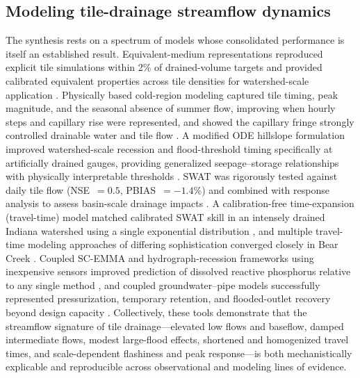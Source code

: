 \subsection{Modeling tile-drainage streamflow dynamics}

The synthesis rests on a spectrum of models whose consolidated performance is itself an established result. Equivalent-medium representations reproduced explicit tile simulations within 2\% of drained-volume targets and provided calibrated equivalent properties across tile densities for watershed-scale application \parencite{Thomas2016}. Physically based cold-region modeling captured tile timing, peak magnitude, and the seasonal absence of summer flow, improving when hourly steps and capillary rise were represented, and showed the capillary fringe strongly controlled drainable water and tile flow \parencite{Kompanizare2024}. A modified ODE hillslope formulation improved watershed-scale recession and flood-threshold timing specifically at artificially drained gauges, providing generalized seepage--storage relationships with physically interpretable thresholds \parencite{Fonley2021}. SWAT was rigorously tested against daily tile flow (NSE~$=0.5$, PBIAS~$=-1.4$\%) and combined with response analysis to assess basin-scale drainage impacts \parencite{Rahman2014}. A calibration-free time-expansion (travel-time) model matched calibrated SWAT skill in an intensely drained Indiana watershed using a single exponential distribution \parencite{Basu2010}, and multiple travel-time modeling approaches of differing sophistication converged closely in Bear Creek \parencite{Schilling2015}. Coupled SC-EMMA and hydrograph-recession frameworks using inexpensive sensors improved prediction of dissolved reactive phosphorus relative to any single method \parencite{Nazari2021}, and coupled groundwater--pipe models successfully represented pressurization, temporary retention, and flooded-outlet recovery beyond design capacity \parencite{Henine2014}. Collectively, these tools demonstrate that the streamflow signature of tile drainage---elevated low flows and baseflow, damped intermediate flows, modest large-flood effects, shortened and homogenized travel times, and scale-dependent flashiness and peak response---is both mechanistically explicable and reproducible across observational and modeling lines of evidence.